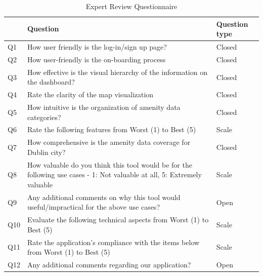 \begin{table}[h!]
  \centering
  \caption{Expert Review Questionnaire}
  \begin{tabular}{|p{}|p{}|p{}|}
    \hline
        & \textbf{Question}                                                                                                        & \textbf{Question type} \\
    \hline
    Q1  & How user friendly is the log-in/sign up page?                                                                            & Closed                 \\
    \hline
    Q2  & How user-friendly is the on-boarding process                                                                             & Closed                 \\
    \hline
    Q3  & How effective is the visual hierarchy of the information on the dashboard?                                               & Closed                 \\
    \hline
    Q4  & Rate the clarity of the map visualization                                                                                & Closed                 \\
    \hline
    Q5  & How intuitive is the organization of amenity data categories?                                                            & Closed                 \\
    \hline
    Q6  & Rate the following features from Worst (1) to Best (5)                                                                   & Scale                  \\
    \hline
    Q7  & How comprehensive is the amenity data coverage for Dublin city?                                                          & Closed                 \\
    \hline
    Q8  & How valuable do you think this tool would be for the following use cases - 1: Not valuable at all, 5: Extremely valuable & Scale                  \\
    \hline
    Q9  & Any additional comments on why this tool would useful/impractical for the above use cases?                               & Open                   \\
    \hline
    Q10 & Evaluate the following technical aspects from Worst (1) to Best (5)                                                      & Scale                  \\
    \hline
    Q11 & Rate the application's compliance with the items below from Worst (1) to Best (5)                                        & Scale                  \\
    \hline
    Q12 & Any additional comments regarding our application?                                                                       & Open                   \\
    \hline
  \end{tabular}
\end{table}

